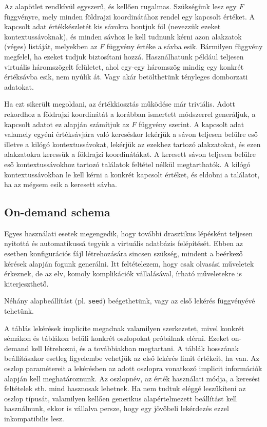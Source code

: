 \documentclass[
    parspace,
    noindent,
    nohyp,
]{elteiktdk}[2023/04/10]
\begin{document}
Az alapötlet rendkívül egyszerű, és kellően rugalmas.
Szükségünk lesz egy $F$ függvényre, mely minden földrajzi koordinátához rendel egy kapcsolt értéket.
A kapcsolt adat értékkészletét kis sávokra bontjuk föl (nevezzük ezeket kontextussávoknak),
és minden sávhoz le kell tudnunk kérni azon alakzatok (véges) listáját,
melyekben az $F$ függvény értéke a sávba esik.
Bármilyen függvény megfelel, ha ezeket tudjuk biztosítani hozzá.
Használhatunk például teljesen virtuális háromszögelt felületet,
ahol egy-egy háromszög mindig egy konkrét értéksávba esik, nem nyúlik át.
Vagy akár betölthetünk tényleges domborzati adatokat.

Ha ezt sikerült megoldani, az értékkiosztás működése már triviális.
Adott rekordhoz a földrajzi koordinátát a korábban ismertett módszerrel generáljuk,
a kapcsolt adatot ez alapján számítjuk az $F$ függvény szerint.
A kapcsolt adat valamely egyéni értéksávjára való kereséskor
lekérjük a sávon teljesen belülre eső illetve a kilógó kontextussávokat,
lekérjük az ezekhez tartozó alakzatokat,
és ezen alakzatokra keressük a földrajzi koordinátákat.
A keresett sávon teljesen belülre eső kontextussávokhoz tartozó találatok feltétel nélkül megtarthatók.
A kilógó kontextussávokban le kell kérni a konkrét kapcsolt értéket,
és eldobni a találatot, ha az mégsem esik a keresett sávba.

\subsection{On-demand schema}

Egyes használati esetek megengedik,
hogy további drasztikus lépésként teljesen nyitottá és automatikussá tegyük a virtuális adatbázis felépítését.
Ebben az esetben konfigurációs fájl létrehozására sincsen szükség,
mindent a beérkező kérések alapján fogunk generálni.
Itt feltételezem, hogy csak olvasási műveletek érkeznek,
de az elv, komoly komplikációk vállalásával, írható műveletekre is kiterjeszthető.

Néhány alapbeállítást (pl. \texttt{seed}) beégethetünk, vagy az első lekérés függvényévé tehetünk.

A táblás lekérések implicite megadnak valamilyen szerkezetet,
mivel konkrét sémákon és táblákon belüli konkrét oszlopokat próbálnak elérni.
Ezeket on-demand kell létrehozni, és a továbbiakban megtartani.
A táblák hosszának beállításakor esetleg figyelembe vehetjük az első lekérés limit értékeit, ha van.
Az oszlop paramétereit a lekérésben az adott oszlopra vonatkozó
implicit információk alapján kell meghatároznunk.
Az oszlopnév, az érték használati módja, a keresési feltételek stb.
mind hasznosak lehetnek.
Ha nem tudtuk eléggé leszűkíteni az oszlop típusát,
valamilyen kellően generikus alapértelmezett beállítást kell használnunk,
ekkor is vállalva persze, hogy egy jövőbeli lekérdezés ezzel inkompatibilis lesz.
\end{document}
